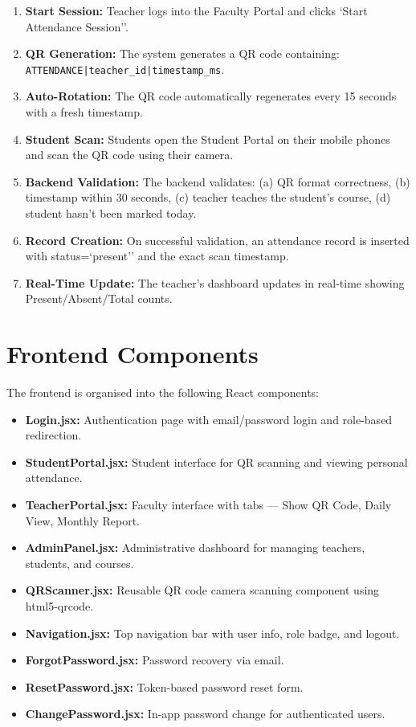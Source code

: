 \documentclass{SOICTthesis}
\begin{document}
\begin{enumerate}
    \item \textbf{Start Session:} Teacher logs into the Faculty Portal and clicks `Start Attendance Session''.
    \item \textbf{QR Generation:} The system generates a QR code containing: \texttt{ATTENDANCE|teacher\_id|timestamp\_ms}.
    \item \textbf{Auto-Rotation:} The QR code automatically regenerates every 15 seconds with a fresh timestamp.
    \item \textbf{Student Scan:} Students open the Student Portal on their mobile phones and scan the QR code using their camera.
    \item \textbf{Backend Validation:} The backend validates: (a) QR format correctness, (b) timestamp within 30 seconds, (c) teacher teaches the student's course, (d) student hasn't been marked today.
    \item \textbf{Record Creation:} On successful validation, an attendance record is inserted with status=`present'' and the exact scan timestamp.
    \item \textbf{Real-Time Update:} The teacher's dashboard updates in real-time showing Present/Absent/Total counts.
\end{enumerate}

\section{Frontend Components}
\label{sec:frontend_components}

The frontend is organised into the following React components:

\begin{itemize}
    \item \textbf{Login.jsx:} Authentication page with email/password login and role-based redirection.
    \item \textbf{StudentPortal.jsx:} Student interface for QR scanning and viewing personal attendance.
    \item \textbf{TeacherPortal.jsx:} Faculty interface with tabs --- Show QR Code, Daily View, Monthly Report.
    \item \textbf{AdminPanel.jsx:} Administrative dashboard for managing teachers, students, and courses.
    \item \textbf{QRScanner.jsx:} Reusable QR code camera scanning component using html5-qrcode.
    \item \textbf{Navigation.jsx:} Top navigation bar with user info, role badge, and logout.
    \item \textbf{ForgotPassword.jsx:} Password recovery via email.
    \item \textbf{ResetPassword.jsx:} Token-based password reset form.
    \item \textbf{ChangePassword.jsx:} In-app password change for authenticated users.
\end{itemize}
\end{document}
